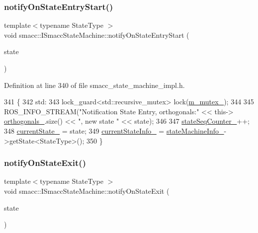 \subsubsection{\texorpdfstring{notify\+On\+State\+Entry\+Start()}{notifyOnStateEntryStart()}}
{\footnotesize\ttfamily template$<$typename State\+Type $>$ \\
void smacc\+::\+I\+Smacc\+State\+Machine\+::notify\+On\+State\+Entry\+Start (\begin{DoxyParamCaption}\item[{State\+Type $\ast$}]{state }\end{DoxyParamCaption})}



Definition at line 340 of file smacc\+\_\+state\+\_\+machine\+\_\+impl.\+h.


\begin{DoxyCode}
341 \{
342 std:
343     lock\_guard<std::recursive\_mutex> lock(\hyperlink{classsmacc_1_1ISmaccStateMachine_aac785541646e5c517273bf31072505a1}{m\_mutex\_});
344 
345     ROS\_INFO\_STREAM(\textcolor{stringliteral}{"Notification State Entry, orthogonals:"} << this->
      \hyperlink{classsmacc_1_1ISmaccStateMachine_acc5944f313bc6ce1637c632243a511f2}{orthogonals\_}.size() << \textcolor{stringliteral}{", new state "} << state);
346 
347     \hyperlink{classsmacc_1_1ISmaccStateMachine_ab41ee07d20715142e2f7c92d551b2bd6}{stateSeqCounter\_}++;
348     \hyperlink{classsmacc_1_1ISmaccStateMachine_a9c6e7745205bcce80a301f2fbe8f7e99}{currentState\_} = state;
349     \hyperlink{classsmacc_1_1ISmaccStateMachine_a95e42f735cecdc231ad5372bf9fe7eaf}{currentStateInfo\_} = \hyperlink{classsmacc_1_1ISmaccStateMachine_a0914aa27c3f51374c338d89a32b135d1}{stateMachineInfo\_}->getState<StateType>();
350 \}
\end{DoxyCode}
\mbox{\label{classsmacc_1_1ISmaccStateMachine_a9d2bd4aca0c80a1ec22c5f95e7c38db8}} 
\subsubsection{\texorpdfstring{notify\+On\+State\+Exit()}{notifyOnStateExit()}}
{\footnotesize\ttfamily template$<$typename State\+Type $>$ \\
void smacc\+::\+I\+Smacc\+State\+Machine\+::notify\+On\+State\+Exit (\begin{DoxyParamCaption}\item[{State\+Type $\ast$}]{state }\end{DoxyParamCaption})}



